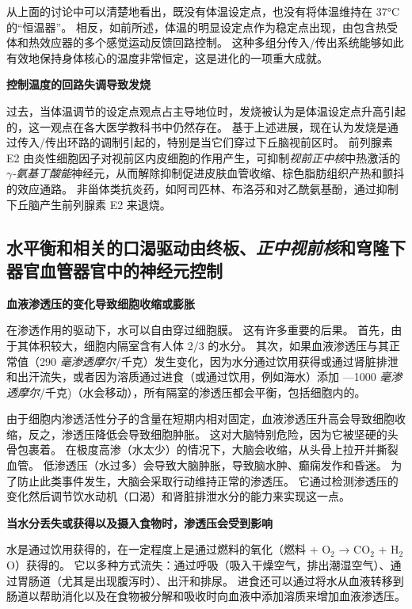 从上面的讨论中可以清楚地看出，既没有体温设定点，也没有将体温维持在 37°C 的“恒温器”。
相反，如前所述，体温的明显设定点作为稳定点出现，由包含热受体和热效应器的多个感觉运动反馈回路控制。
这种多组分传入/传出系统能够如此有效地保持身体核心的温度非常恒定，这是进化的一项重大成就。


\textbf{控制温度的回路失调导致发烧}

过去，当体温调节的设定点观点占主导地位时，发烧被认为是体温设定点升高引起的，这一观点在各大医学教科书中仍然存在。
基于上述进展，现在认为发烧是通过传入/传出环路的调制引起的，特别是当它们穿过下丘脑视前区时。
前列腺素 E2 由炎性细胞因子对视前区内皮细胞的作用产生，可抑制\textit{视前正中核}中热激活的\textit{$\gamma$-氨基丁酸能}神经元，从而解除抑制促进皮肤血管收缩、棕色脂肪组织产热和颤抖的效应通路。
非甾体类抗炎药，如阿司匹林、布洛芬和对乙酰氨基酚，通过抑制下丘脑产生前列腺素 E2 来退烧。



\subsection{水平衡和相关的口渴驱动由终板、\textit{正中视前核}和穹隆下器官血管器官中的神经元控制}

\textbf{血液渗透压的变化导致细胞收缩或膨胀}

在渗透作用的驱动下，水可以自由穿过细胞膜。
这有许多重要的后果。
首先，由于其体积较大，细胞内隔室含有人体 2/3 的水分。
其次，如果血液渗透压与其正常值（290 \textit{毫渗透摩尔}/千克）发生变化，因为水分通过饮用获得或通过肾脏排泄和出汗流失，或者因为溶质通过进食（或通过饮用，例如海水）添加 —1000 \textit{毫渗透摩尔}/千克)（水会移动），所有隔室的渗透压都会平衡，包括细胞内的。


由于细胞内渗透活性分子的含量在短期内相对固定，血液渗透压升高会导致细胞收缩，反之，渗透压降低会导致细胞肿胀。
这对大脑特别危险，因为它被坚硬的头骨包裹着。
在极度高渗（水太少）的情况下，大脑会收缩，从头骨上拉开并撕裂血管。
低渗透压（水过多）会导致大脑肿胀，导致脑水肿、癫痫发作和昏迷。
为了防止此类事件发生，大脑会采取行动维持正常的渗透压。
它通过检测渗透压的变化然后调节饮水动机（口渴）和肾脏排泄水分的能力来实现这一点。


\textbf{当水分丢失或获得以及摄入食物时，渗透压会受到影响}

水是通过饮用获得的，在一定程度上是通过燃料的氧化（燃料 + O$_2$ → CO$_2$ + H$_2$O）获得的。
它以多种方式流失：通过呼吸（吸入干燥空气，排出潮湿空气）、通过胃肠道（尤其是出现腹泻时）、出汗和排尿。
进食还可以通过将水从血液转移到肠道以帮助消化以及在食物被分解和吸收时向血液中添加溶质来增加血液渗透压。


